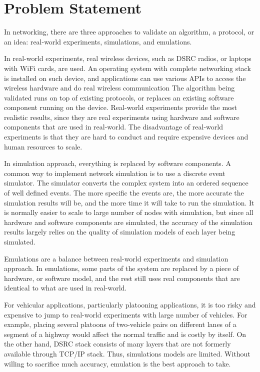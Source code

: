 \documentclass[12pt]{report}
\begin{document}
\section{Problem Statement}
\label{sec:problem_validation}

In networking, there are three approaches to validate an algorithm, a protocol, or an idea: real-world experiments, simulations, and emulations.

In real-world experiments, real wireless devices, such as DSRC radios, or laptops with WiFi cards, are used. An operating system with complete networking stack is installed on such device, and applications can use various APIs to access the wireless hardware and do real wireless communication The algorithm being validated runs on top of existing protocols, or replaces an existing software component running on the device. Real-world experiments provide the most realistic results, since they are real experiments using hardware and software components that are used in real-world. The disadvantage of real-world experiments is that they are hard to conduct and require expensive devices and human resources to scale.

In simulation approach, everything is replaced by software components. A common way to implement network simulation is to use a discrete event simulator. The simulator converts the complex system into an ordered sequence of well defined events. The more specific the events are, the more accurate the simulation results will be, and the more time it will take to run the simulation. It is normally easier to scale to large number of nodes with simulation, but since all hardware and software components are simulated, the accuracy of the simulation results largely relies on the quality of simulation models of each layer being simulated.

Emulations are a balance between real-world experiments and simulation approach. In emulations, some parts of the system are replaced by a piece of hardware, or software model, and the rest still uses real components that are identical to what are used in real-world.

For vehicular applications, particularly platooning applications, it is too risky and expensive to jump to real-world experiments with large number of vehicles. For example, placing several platoons of two-vehicle pairs on different lanes of a segment of a highway would affect the normal traffic and is costly by itself. On the other hand, DSRC stack consists of many layers that are not formerly available through TCP/IP stack. Thus, simulations models are limited. Without willing to sacrifice much accuracy, emulation is the best approach to take.
\end{document}
